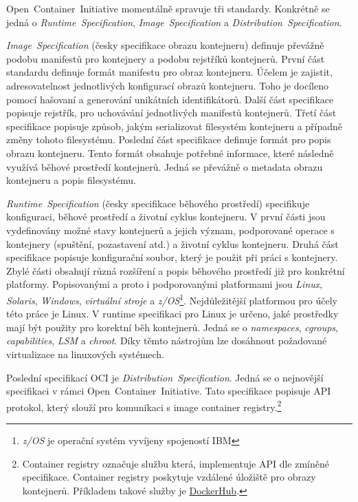 Open~Container~Initiative momentálně spravuje tři standardy. Konkrétně se jedná o \textit{Runtime~Specification}, \textit{Image~Specification} a \textit{Distribution~Specification}. \cite{thelinuxfoundation_about}

\textit{Image~Specification} (česky specifikace obrazu kontejneru) definuje převážně podobu manifestů pro kontejnery a podobu rejstříků kontejnerů. První část standardu definuje formát manifestu pro obraz kontejneru. Účelem je zajistit, adresovatelnost jednotlivých konfigurací obrazů kontejneru. Toho je docíleno pomocí hašovaní a generování unikátních identifikátorů. Další část specifikace popisuje rejstřík, pro uchovávání jednotlivých manifestů kontejnerů. Třetí část specifikace popisuje způsob, jakým serializovat filesystém kontejneru a případně změny tohoto filesystému. Poslední část specifikace definuje formát pro popis obrazu kontejneru. Tento formát obsahuje potřebné informace, které následně využívá běhové prostředí kontejnerů. Jedná se převážně o metadata obrazu kontejneru a popis filesystému. \cite{opencontainerinitiative_2022_image}

\textit{Runtime~Specification} (česky specifikace běhového prostředí) specifikuje konfiguraci, běhové prostředí a životní cyklus kontejneru. V první části jsou vydefinovány možné stavy kontejnerů a jejich význam, podporované operace s kontejnery (spuštění, pozastavení atd.) a životní cyklus kontejneru. Druhá část specifikace popisuje konfigurační soubor, který je použit při práci s kontejnery. Zbylé části obsahují různá rozšíření a popis běhového prostředí již pro konkrétní platformy. Popisovanými a proto i podporovanými platformami jsou \textit{Linux}, \textit{Solaris}, \textit{Windows}, \textit{virtuální stroje} a \textit{z/OS}\footnote{\textit{z/OS} je operační systém vyvíjeny spojeností IBM}. Nejdůležitější platformou pro účely této práce je Linux. V runtime specifikaci pro Linux je určeno, jaké prostředky mají být použity pro korektní běh kontejnerů. Jedná se o \textit{namespaces}, \textit{cgroups}, \textit{capabilities}, \textit{LSM} a \textit{chroot}. Díky těmto nástrojům lze dosáhnout požadované virtualizace na linuxových systémech. \cite{opencontainerinitiative_2022_open}

Poslední specifikací OCI je \textit{Distribution~Specification}. Jedná se o nejnovější specifikaci v rámci Open~Container~Initiative. Tato specifikace popisuje API protokol, který slouží pro komunikaci s image container registry.\footnote{Container registry označuje službu která, implementuje API dle zmíněné specifikace. Container registry poskytuje vzdálené úložiště pro obrazy kontejnerů. Příkladem takové služby je \href{https://hub.docker.com/}{DockerHub}.} \cite{opencontainerinitiative_2022_distribution}

